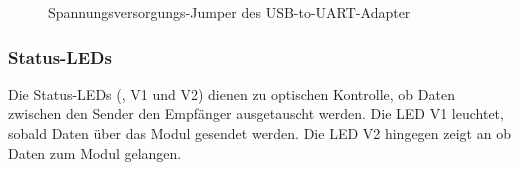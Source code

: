 \begin{figure}[htb]
    \centering
    \qquad
    \qquad
    \caption[Spannungsversorgungs-Jumper des USB-to-UART-Adapter]{Spannungsversorgungs-Jumper des \gls{USB-to-UART}-Adapter}
    \label{fig:usbtouart-spannung3}
\end{figure}

\subsubsection{Status-LEDs}
Die Status-LEDs (, V1 und V2) dienen zu optischen Kontrolle, ob Daten zwischen den Sender den Empfänger ausgetauscht werden. Die LED V1 leuchtet, sobald Daten über das Modul gesendet werden. Die LED V2 hingegen zeigt an ob Daten zum Modul gelangen.

